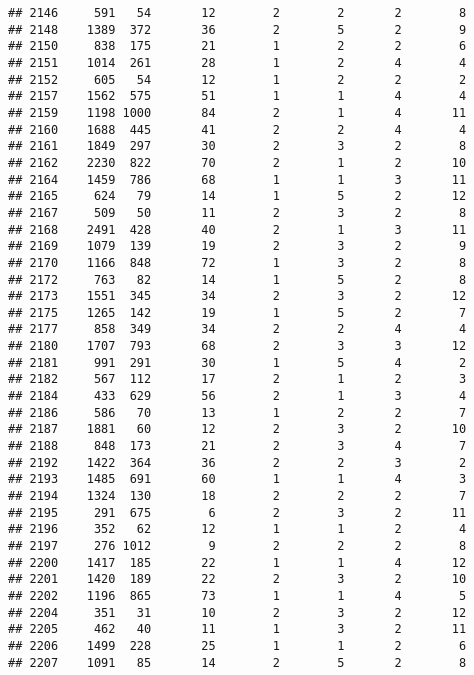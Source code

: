 \documentclass[]{article}
\begin{document}
\begin{verbatim}
## 2146     591   54       12        2        2       2        8
## 2148    1389  372       36        2        5       2        9
## 2150     838  175       21        1        2       2        6
## 2151    1014  261       28        1        2       4        4
## 2152     605   54       12        1        2       2        2
## 2157    1562  575       51        1        1       4        4
## 2159    1198 1000       84        2        1       4       11
## 2160    1688  445       41        2        2       4        4
## 2161    1849  297       30        2        3       2        8
## 2162    2230  822       70        2        1       2       10
## 2164    1459  786       68        1        1       3       11
## 2165     624   79       14        1        5       2       12
## 2167     509   50       11        2        3       2        8
## 2168    2491  428       40        2        1       3       11
## 2169    1079  139       19        2        3       2        9
## 2170    1166  848       72        1        3       2        8
## 2172     763   82       14        1        5       2        8
## 2173    1551  345       34        2        3       2       12
## 2175    1265  142       19        1        5       2        7
## 2177     858  349       34        2        2       4        4
## 2180    1707  793       68        2        3       3       12
## 2181     991  291       30        1        5       4        2
## 2182     567  112       17        2        1       2        3
## 2184     433  629       56        2        1       3        4
## 2186     586   70       13        1        2       2        7
## 2187    1881   60       12        2        3       2       10
## 2188     848  173       21        2        3       4        7
## 2192    1422  364       36        2        2       3        2
## 2193    1485  691       60        1        1       4        3
## 2194    1324  130       18        2        2       2        7
## 2195     291  675        6        2        3       2       11
## 2196     352   62       12        1        1       2        4
## 2197     276 1012        9        2        2       2        8
## 2200    1417  185       22        1        1       4       12
## 2201    1420  189       22        2        3       2       10
## 2202    1196  865       73        1        1       4        5
## 2204     351   31       10        2        3       2       12
## 2205     462   40       11        1        3       2       11
## 2206    1499  228       25        1        1       2        6
## 2207    1091   85       14        2        5       2        8

\end{verbatim}
\end{document}
